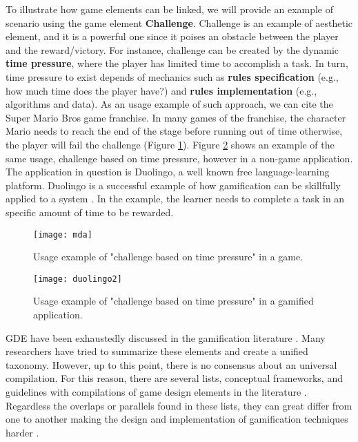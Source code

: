 To illustrate how game elements can be linked, we will provide an example of scenario using the game element \textbf{Challenge}. Challenge is an example of aesthetic element, and it is a powerful one since it poises an obstacle between the player and the reward/victory. 
For instance, challenge can be created by the dynamic \textbf{time pressure}, where the player has limited time to accomplish a task. 
In turn, time pressure to exist depends of mechanics such as \textbf{rules specification} (e.g., how much time does the player have?) and \textbf{rules implementation} (e.g., algorithms and data). 
As an usage example of such approach, we can cite the Super Mario Bros \textsuperscript{\textregistered} game franchise. In many games of the franchise, the character Mario needs to reach the end of the stage before running out of time otherwise, the player will fail the challenge (Figure \ref{fig:mda}). Figure \ref{fig:duolingo} shows an example of the same usage, challenge based on time pressure, however in a non-game application. The application in question is Duolingo, a well known free language-learning platform. Duolingo is a successful example of how gamification can be skillfully applied to a system \cite{Huynh2016}. In the example, the learner needs to complete a task in an specific amount of time to be rewarded. 
\begin{figure}[h!]
\caption{Usage example of "challenge based on time pressure" in a game.}
\centering
\texttt{[image: mda]}
\label{fig:mda}
\end{figure}

\begin{figure}[h!]
\caption{Usage example of "challenge based on time pressure" in a gamified application.}
\centering
\texttt{[image: duolingo2]}
\label{fig:duolingo}
\end{figure}

GDE have been exhaustedly discussed in the gamification literature \cite{kapp2012gamification,robinson2013preliminary,werbach2012win,zichermann2010game,zichermann2011gamification,Ferro2013}.
Many researchers have tried to summarize these elements and create a unified taxonomy. However, up to this point, there is no consensus about an universal compilation. 
For this reason, 
there are several lists, conceptual frameworks, and guidelines with compilations of game design elements in the literature \cite{Ferro2013,A_Link_Between_Worlds}. 
Regardless the overlaps or parallels found in these lists, 
they can great differ from one to another making the design and implementation of gamification techniques harder \cite{Sailer2017}.

